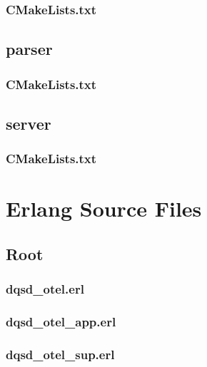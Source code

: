 \subsubsection*{CMakeLists.txt}


\subsection*{parser}

\subsubsection*{CMakeLists.txt}


\subsection*{server}

\subsubsection*{CMakeLists.txt}


\section{Erlang Source Files}

\subsection*{Root}

\subsubsection*{dqsd\_otel.erl}


\subsubsection*{dqsd\_otel\_app.erl}


\subsubsection*{dqsd\_otel\_sup.erl}



